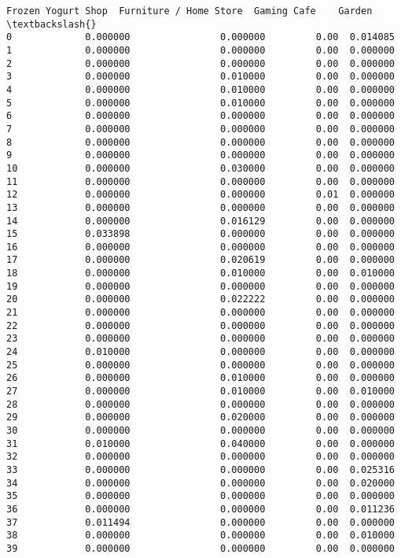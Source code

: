 \documentclass[11pt]{article}
\begin{document}
\begin{tcolorbox}[breakable, size=fbox, boxrule=.5pt, pad at break*=1mm, opacityfill=0]
\begin{Verbatim}[commandchars=\\\{\}]
    Frozen Yogurt Shop  Furniture / Home Store  Gaming Cafe    Garden  \textbackslash{}
0             0.000000                0.000000         0.00  0.014085
1             0.000000                0.000000         0.00  0.000000
2             0.000000                0.000000         0.00  0.000000
3             0.000000                0.010000         0.00  0.000000
4             0.000000                0.010000         0.00  0.000000
5             0.000000                0.010000         0.00  0.000000
6             0.000000                0.000000         0.00  0.000000
7             0.000000                0.000000         0.00  0.000000
8             0.000000                0.000000         0.00  0.000000
9             0.000000                0.000000         0.00  0.000000
10            0.000000                0.030000         0.00  0.000000
11            0.000000                0.000000         0.00  0.000000
12            0.000000                0.000000         0.01  0.000000
13            0.000000                0.000000         0.00  0.000000
14            0.000000                0.016129         0.00  0.000000
15            0.033898                0.000000         0.00  0.000000
16            0.000000                0.000000         0.00  0.000000
17            0.000000                0.020619         0.00  0.000000
18            0.000000                0.010000         0.00  0.010000
19            0.000000                0.000000         0.00  0.000000
20            0.000000                0.022222         0.00  0.000000
21            0.000000                0.000000         0.00  0.000000
22            0.000000                0.000000         0.00  0.000000
23            0.000000                0.000000         0.00  0.000000
24            0.010000                0.000000         0.00  0.000000
25            0.000000                0.000000         0.00  0.000000
26            0.000000                0.010000         0.00  0.000000
27            0.000000                0.010000         0.00  0.010000
28            0.000000                0.000000         0.00  0.000000
29            0.000000                0.020000         0.00  0.000000
30            0.000000                0.000000         0.00  0.000000
31            0.010000                0.040000         0.00  0.000000
32            0.000000                0.000000         0.00  0.000000
33            0.000000                0.000000         0.00  0.025316
34            0.000000                0.000000         0.00  0.020000
35            0.000000                0.000000         0.00  0.000000
36            0.000000                0.000000         0.00  0.011236
37            0.011494                0.000000         0.00  0.000000
38            0.000000                0.000000         0.00  0.010000
39            0.000000                0.000000         0.00  0.000000


\end{Verbatim}
\end{tcolorbox}
\end{document}
